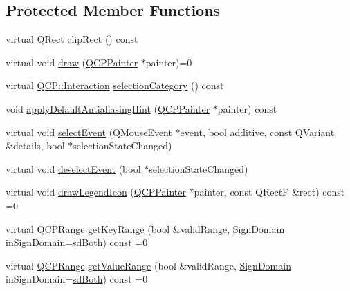 \subsection*{Protected Member Functions}
\begin{DoxyCompactItemize}
\item 
virtual Q\-Rect \hyperlink{class_q_c_p_abstract_plottable_ac01960b0827913922f5364d559c124ed}{clip\-Rect} () const 
\item 
virtual void \hyperlink{class_q_c_p_abstract_plottable_acbab5e30dcd04fd302b4a5902ac2c482}{draw} (\hyperlink{class_q_c_p_painter}{Q\-C\-P\-Painter} $\ast$painter)=0
\item 
virtual \hyperlink{namespace_q_c_p_a2ad6bb6281c7c2d593d4277b44c2b037}{Q\-C\-P\-::\-Interaction} \hyperlink{class_q_c_p_abstract_plottable_a5eef607bcc2aee8bfe2380a8710f6c64}{selection\-Category} () const 
\item 
void \hyperlink{class_q_c_p_abstract_plottable_a76e9d6cc7972dc1528f526d163766aca}{apply\-Default\-Antialiasing\-Hint} (\hyperlink{class_q_c_p_painter}{Q\-C\-P\-Painter} $\ast$painter) const 
\item 
virtual void \hyperlink{class_q_c_p_abstract_plottable_a16aaad02456aa23a759efd1ac90c79bf}{select\-Event} (Q\-Mouse\-Event $\ast$event, bool additive, const Q\-Variant \&details, bool $\ast$selection\-State\-Changed)
\item 
virtual void \hyperlink{class_q_c_p_abstract_plottable_a6fa0d0f95560ea8b01ee13f296dab2b1}{deselect\-Event} (bool $\ast$selection\-State\-Changed)
\item 
virtual void \hyperlink{class_q_c_p_abstract_plottable_a9a450783fd9ed539e589999fd390cdf7}{draw\-Legend\-Icon} (\hyperlink{class_q_c_p_painter}{Q\-C\-P\-Painter} $\ast$painter, const Q\-Rect\-F \&rect) const =0
\item 
virtual \hyperlink{class_q_c_p_range}{Q\-C\-P\-Range} \hyperlink{class_q_c_p_abstract_plottable_a7aa24ed0b3c39bd99338c7b9f145a71b}{get\-Key\-Range} (bool \&valid\-Range, \hyperlink{class_q_c_p_abstract_plottable_a661743478a1d3c09d28ec2711d7653d8}{Sign\-Domain} in\-Sign\-Domain=\hyperlink{class_q_c_p_abstract_plottable_a661743478a1d3c09d28ec2711d7653d8a082b98cfb91a7363a3b5cd17b0c1cd60}{sd\-Both}) const =0
\item 
virtual \hyperlink{class_q_c_p_range}{Q\-C\-P\-Range} \hyperlink{class_q_c_p_abstract_plottable_aed35cfebe5546feea7af2638dd869d5f}{get\-Value\-Range} (bool \&valid\-Range, \hyperlink{class_q_c_p_abstract_plottable_a661743478a1d3c09d28ec2711d7653d8}{Sign\-Domain} in\-Sign\-Domain=\hyperlink{class_q_c_p_abstract_plottable_a661743478a1d3c09d28ec2711d7653d8a082b98cfb91a7363a3b5cd17b0c1cd60}{sd\-Both}) const =0

\end{DoxyCompactItemize}

